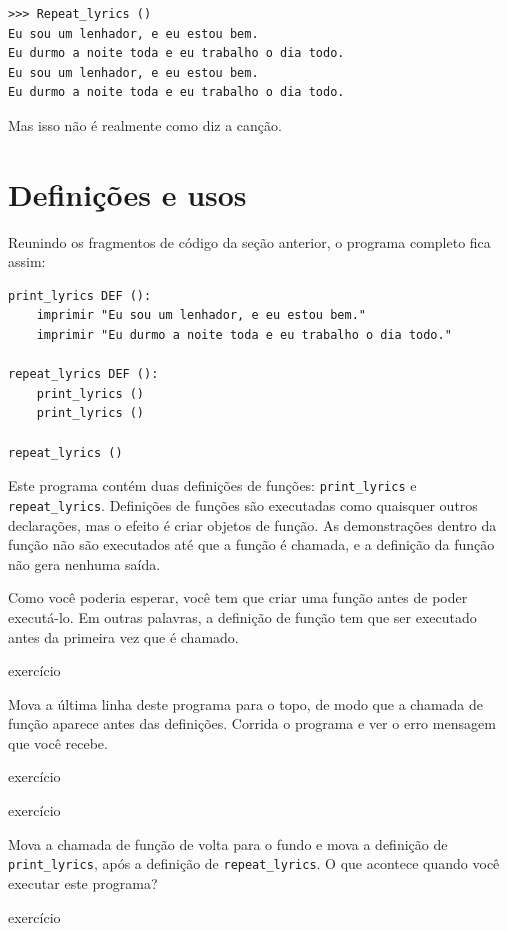 \documentclass[10pt]{book}
\begin{document}
\begin{verbatim}
>>> Repeat_lyrics ()
Eu sou um lenhador, e eu estou bem.
Eu durmo a noite toda e eu trabalho o dia todo.
Eu sou um lenhador, e eu estou bem.
Eu durmo a noite toda e eu trabalho o dia todo.
\end{verbatim}
%
Mas isso não é realmente como diz a canção.


\section{Definições e usos}

Reunindo os fragmentos de código da seção anterior, o
programa completo fica assim:

\begin{verbatim}
print_lyrics DEF ():
    imprimir "Eu sou um lenhador, e eu estou bem."
    imprimir "Eu durmo a noite toda e eu trabalho o dia todo."

repeat_lyrics DEF ():
    print_lyrics ()
    print_lyrics ()

repeat_lyrics ()
\end{verbatim}
%
Este programa contém duas definições de funções: \verb "print_lyrics" e
\verb "repeat_lyrics". Definições de funções são executadas como quaisquer outros
declarações, mas o efeito é criar objetos de função. As demonstrações
dentro da função não são executados até que a função é chamada, e
a definição da função não gera nenhuma saída.

Como você poderia esperar, você tem que criar uma função antes de poder
executá-lo. Em outras palavras, a definição de função tem que ser
executado antes da primeira vez que é chamado.

\begin{} exercício

Mova a última linha deste programa
para o topo, de modo que a chamada de função aparece antes das definições. Corrida
o programa e ver o erro
mensagem que você recebe.

\end{} exercício

\begin{} exercício

Mova a chamada de função de volta para o fundo
e mova a definição de \verb "print_lyrics", após a definição de
\verb "repeat_lyrics". O que acontece quando você executar este programa?

\end{} exercício
\end{document}
